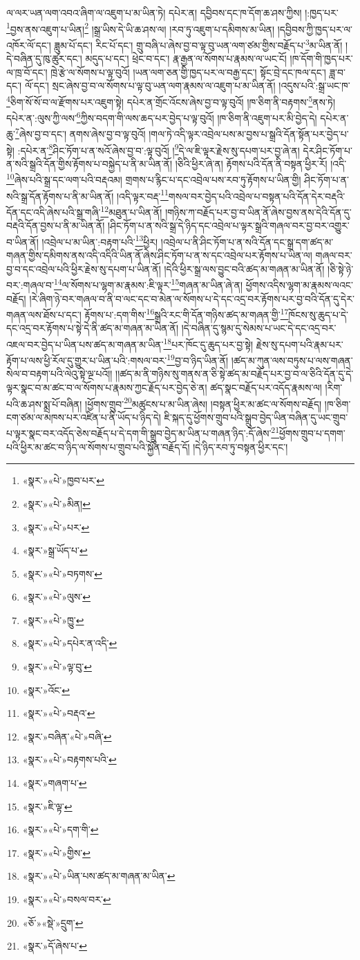 ལ་ལར་ཡན་ལག་འབའ་ཞིག་ལ་འཇུག་པ་མ་ཡིན་ཏེ། དཔེར་ན། དབྱིབས་དང་ཁ་དོག་ཆ་ཤས་ཀྱིས། །:ཁྱད་པར་\footnote{«སྣར་»«པེ་»ཁྱབ་པར་}བྱས་ནས་འཇུག་པ་ཡིན།\footnote{«སྣར་»«པེ་»མིན།} །སྒྲ་ཡིས་དེ་ཡི་ཆ་ཤས་ལ། །རབ་ཏུ་འཇུག་པ་དམིགས་མ་ཡིན། །དབྱིབས་ཀྱི་ཁྱད་པར་ལ་འཁོར་ལོ་དང་། ཟླུམ་པོ་དང་། རིང་པོ་དང་། གྲུ་བཞི་པ་ཞེས་བྱ་བ་ལྟ་བུ་ཡན་ལག་ཙམ་གྱིས་བརྗོད་པ་\footnote{«སྣར་»«པེ་»པར་}མ་ཡིན་ནོ། །དེ་བཞིན་དུ་ཁུ་ཚུར་དང་། མདུད་པ་དང་། ཕྲེང་བ་དང་། རྣ་རྒྱན་ལ་སོགས་པ་རྣམས་ལ་ཡང་ངོ། །ཁ་དོག་གི་ཁྱད་པར་ལ་ཁྲ་བོ་དང་། ཁྲེ་རྩེ་ལ་སོགས་པ་ལྟ་བུའོ། །ཡན་ལག་ཅན་གྱི་ཁྱད་པར་ལ་བརྒྱ་དང་། སྟོང་བྲེ་དང་ཁལ་དང་། ཟླ་བ་དང་། ལོ་དང་། སྲང་ཞེས་བྱ་བ་ལ་སོགས་པ་ལྟ་བུ་ཡན་ལག་རྣམས་ལ་འཇུག་པ་མ་ཡིན་ནོ། །འདུས་པའི་:སྒྲ་ཡང་ཁ་\footnote{«སྣར་»སྒྲ་ཡོད་པ་}ཅིག་སོ་སོ་བ་ལ་རྫོགས་པར་འཇུག་སྟེ། དཔེར་ན་གྲོང་འོངས་ཞེས་བྱ་བ་ལྟ་བུའོ། །ཁ་ཅིག་ནི་བརྟགས་\footnote{«སྣར་»«པེ་»བཏགས་}ནས་ཏེ། དཔེར་ན་:ལུས་ཀྱི་ལས་\footnote{«སྣར་»«པེ་»ལུས་}ཀྱིས་བདག་གི་ལས་ཆད་པར་བྱེད་པ་ལྟ་བུའོ། །ཁ་ཅིག་ནི་འཇུག་པར་མི་བྱེད་དེ། དཔེར་ན་ཆུ་\footnote{«སྣར་»«པེ་»ཁྱུ་}ཞེས་བྱ་བ་དང་། ནགས་ཞེས་བྱ་བ་ལྟ་བུའོ། །གལ་ཏེ་འདི་ལྟར་འབྲེལ་པས་མ་བྱས་པ་སྒྲའི་དོན་སྟོན་པར་བྱེད་པ་སྟེ། :དཔེར་ན་\footnote{«སྣར་»«པེ་»དཔེར་ན་འདི་}ཤིང་ཏོག་པ་ན་སའོ་ཞེས་བྱ་བ་:ལྟ་བུའོ། །\footnote{«སྣར་»«པེ་»ལྟ་བུ་}དེ་ལ་ཇི་ལྟར་རྗེས་སུ་དཔག་པར་བྱ་ཞེ་ན། དེར་ཤིང་ཏོག་པ་ན་སའི་སྒྲའི་དོན་གྱིས་རྟོགས་པ་བསྐྱེད་པ་ནི་མ་ཡིན་ནོ། །ཅིའི་ཕྱིར་ཞེ་ན། རྟོགས་པའི་དོན་ནི་བསྟན་ཕྱིར་རོ། །འདི་\footnote{«སྣར་»འོང་}ཞེས་པའི་སྒྲ་དང་ལག་པའི་བརྡའམ། གྲགས་པ་རྙིང་པ་དང་འབྲེལ་པས་རབ་ཏུ་རྟོགས་པ་ཡིན་གྱི། ཤིང་ཏོག་པ་ན་སའི་སྒྲ་དོན་རྟོགས་པ་ནི་མ་ཡིན་ནོ། །འདི་ལྟར་བརྡ་\footnote{«སྣར་»«པེ་»བརྡའ་}གསལ་བར་བྱེད་པའི་འབྲེལ་པ་བསྟན་པའི་དོན་དེར་བརྡའི་དོན་དང་འདི་ཞེས་པའི་སྒྲ་གཞི་\footnote{«སྣར་»བཞིན་«པེ་»བཞི་}མཐུན་པ་ཡིན་ནོ། །གཉིས་ཀ་བརྗོད་པར་བྱ་བ་ཡིན་ནོ་ཞེས་བྱས་ནས་དེའི་དོན་དུ་བརྡའི་དོན་བྱས་པ་ནི་མ་ཡིན་ནོ། །ཤིང་ཏོག་པ་ན་སའི་སྒྲ་དེ་ཉིད་དང་འབྲེལ་པ་ལྟར་སྒྲའི་གཞལ་བར་བྱ་བར་འགྱུར་བ་ཡིན་ནོ། །འབྲེལ་པ་མ་ཡིན་:བརྟག་པའི་\footnote{«སྣར་»«པེ་»བརྟགས་པའི་}ཕྱིར། །འབྲེལ་པ་ནི་ཤིང་ཏོག་པ་ན་སའི་དོན་དང་སྒྲ་དག་ཚད་མ་གཞན་གྱིས་དམིགས་ནས་འདི་འདིའི་ཡིན་ནོ་ཞེས་ཤིང་ཏོག་པ་ན་ས་དང་འབྲེལ་པར་རྟོགས་པ་ཡིན་ལ། གཞལ་བར་བྱ་བ་དང་འབྲེལ་པའི་ཕྱིར་རྗེས་སུ་དཔག་པ་ཡིན་ནོ། །དེའི་ཕྱིར་སྒྲ་ལས་བྱུང་བའི་ཚད་མ་གཞན་མ་ཡིན་ནོ། །ཅི་སྟེ་ཉེ་བར་:གཞལ་བ་\footnote{«སྣར་»གཞག་པ་}ལ་སོགས་པ་ལྷག་མ་རྣམས་:ཇི་ལྟར་\footnote{«སྣར་»ཇི་ལྟ་}གཞན་མ་ཡིན་ཞེ་ན། ཕྱོགས་འདིས་ལྷག་མ་རྣམས་ལའང་བརྗོད། །རེ་ཞིག་ཉེ་བར་གཞལ་བ་ནི་བ་ལང་དང་བ་མེན་ལ་སོགས་པ་དེ་དང་འདྲ་བར་རྟོགས་པར་བྱ་བའི་དོན་དུ་དེར་གཞན་ལས་ཐོས་པ་དང་། རྟོགས་པ་:དག་གིས་\footnote{«སྣར་»«པེ་»དག་གི་}སྒྲའི་རང་གི་དོན་གཉིས་ཚད་མ་གཞན་གྱི་\footnote{«སྣར་»«པེ་»གྱིས་}ཁོངས་སུ་ཆུད་པ་དེ་དང་འདྲ་བར་རྟོགས་པ་སྟེ་དེ་ནི་ཚད་མ་གཞན་མ་ཡིན་ནོ། །དེ་བཞིན་དུ་སྙམ་དུ་སེམས་པ་ཡང་དེ་དང་འདྲ་བར་འཇལ་བར་བྱེད་པ་ཡིན་པས་ཚད་མ་གཞན་མ་ཡིན་\footnote{«སྣར་»«པེ་»ཡིན་པས་ཚད་མ་གཞན་མ་ཡིན་}པར་ཁོང་དུ་ཆུད་པར་བྱ་སྟེ། རྗེས་སུ་དཔག་པའི་རྣམ་པར་རྟོག་པ་ལས་ཕྱི་རོལ་དུ་གྱུར་པ་ཡིན་པའི་:གསལ་བར་\footnote{«སྣར་»«པེ་»བསལ་བར་}བྱ་བ་ཉིད་ཡིན་ནོ། །ཚད་མ་ཀུན་ལས་བཏུས་པ་ལས་གཞན་སེལ་བ་བརྟག་པའི་ལེའུ་སྟེ་ལྔ་པའོ།། །།ཚད་མ་ནི་གཉིས་སུ་གནས་ན་ཅི་སྟེ་ཚད་མ་བརྗོད་པར་བྱ་བ་ལ་ཅིའི་དོན་དུ་དེ་ལྟར་སྣང་བ་མ་ཚང་བ་ལ་སོགས་པ་རྣམས་ཀྱང་རྗོད་པར་བྱེད་ཅེ་ན། ཚད་སྣང་བརྗོད་པར་འདོད་རྣམས་ལ། །རིག་པའི་ཆ་ཤས་སྨྲ་པོ་བཞིན། །ཕྱོགས་གྲུབ་\footnote{«ཅོ་»«སྡེ་»དྲུག་}མཚུངས་པ་མ་ཡིན་ཞེས། །བསྟན་ཕྱིར་མ་ཚང་ལ་སོགས་བརྗོད། །ཁ་ཅིག་ངག་ཙམ་ལ་མཁས་པར་འཛིན་པ་ནི་ཡོད་པ་ཉིད་དེ། ཇི་སྐད་དུ་ཕྱོགས་གྲུབ་པའི་སྒྲུབ་བྱེད་ཡིན་བཞིན་དུ་ཡང་གྲུབ་པ་ལྟར་སྣང་བར་འདོད་ཅེས་བརྗོད་པ་དེ་དག་གི་སྒྲུབ་བྱེད་མ་ཡིན་པ་གཞན་ཉིད་:དོ་ཞེས་\footnote{«སྣར་»དོ་ཞེས་པ་}ཕྱོགས་གྲུབ་པ་དགག་པའི་ཕྱིར་མ་ཚང་བ་ཉིད་ལ་སོགས་པ་གྲུབ་པའི་སྐྱོན་བརྗོད་དོ། །དེ་ཉིད་རབ་ཏུ་བསྟན་ཕྱིར་དང་། 